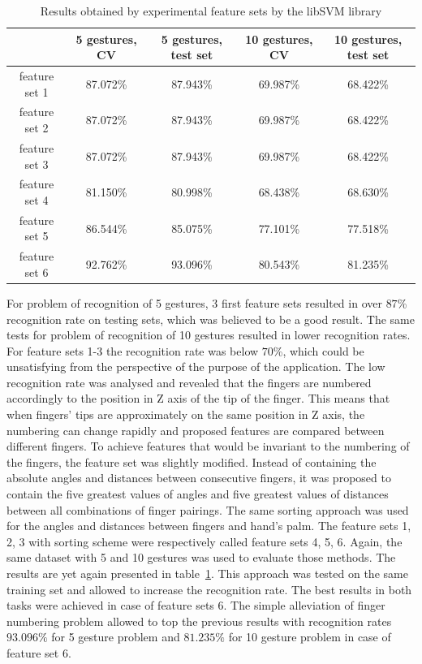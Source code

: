 \begin{table}[htp!]
	\label{staticfeat}
	\caption{Results obtained by experimental feature sets by the libSVM library}
    \begin{tabular}{|c|c|c|c|c|}
    \hline
    ~                                                   & 5 gestures, CV & 5 gestures, test set & 10 gestures, CV  & 10 gestures, test set \\ \hline
    feature set 1                     & 87.072\% & 87.943\% & 69.987\% & 68.422\%   \\ \hline
    feature set 2                     & 87.072\% & 87.943\% & 69.987\% & 68.422\%          \\ \hline
    feature set 3                     & 87.072\% & 87.943\% & 69.987\% & 68.422\%           \\ \hline
    feature set 4                     & 81.150\% & 80.998\% & 68.438\% & 68.630\%          \\ \hline
    feature set 5                     & 86.544\% & 85.075\% & 77.101\% & 77.518\%          \\ \hline
    feature set 6                     & 92.762\% & 93.096\% & 80.543\% & 81.235\%           \\ \hline
    \end{tabular}
\end{table}

For problem of recognition of 5 gestures, 3 first feature sets resulted in over $87$\% recognition rate on testing sets, which was believed to be a good result.
The same tests for problem of recognition of 10 gestures resulted in lower recognition rates.
For feature sets 1-3 the recognition rate was below $70$\%, which could be unsatisfying from the perspective of the purpose of the application.
The low recognition rate was analysed and revealed that the fingers are numbered accordingly to the position in Z axis of the tip of the finger.
This means that when fingers' tips are approximately on the same position in Z axis, the numbering can change rapidly and proposed features are compared between different fingers.
To achieve features that would be invariant to the numbering of the fingers, the feature set was slightly modified.
Instead of containing the absolute angles and distances between consecutive fingers, it was proposed to contain the five greatest values of angles and five greatest values of distances between all combinations of finger pairings.
The same sorting approach was used for the angles and distances between fingers and hand's palm.
The feature sets 1, 2, 3 with sorting scheme were respectively called feature sets 4, 5, 6.
Again, the same dataset with 5 and 10 gestures was used to evaluate those methods. 
The results are yet again presented in table~\ref{staticfeat}.
This approach was tested on the same training set and allowed to increase the recognition rate.
The best results in both tasks were achieved in case of feature sets 6.
The simple alleviation of finger numbering problem allowed to top the previous results with recognition rates $93.096\%$ for 5 gesture problem and $81.235\%$ for 10 gesture problem in case of feature set 6. 

